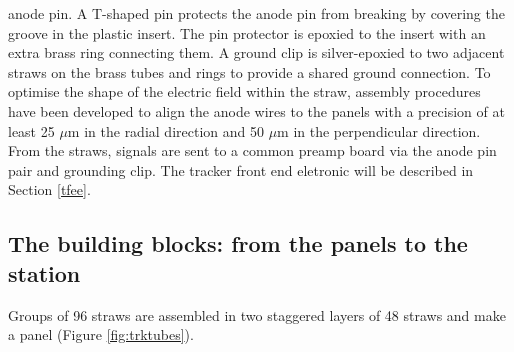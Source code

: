         anode pin. A T-shaped pin protects the anode pin from 
        breaking by covering the groove in the plastic insert. 
        The pin protector is epoxied to the insert with an extra 
        brass ring connecting them. A ground clip is silver-epoxied 
        to two adjacent straws on the brass tubes and rings to 
        provide a shared ground connection.
        To optimise the shape of the electric field within 
        the straw, assembly procedures have been developed 
        to align the anode wires to the panels with a 
        precision of at least 25 $\mu$m in the radial direction and 50 $\mu$m in the perpendicular direction. 
From the straws, signals are sent to a common preamp board 
via the anode pin pair and grounding clip. The tracker front 
end eletronic will be described in Section \ref{tfee}.
\subsection{The building blocks: from the panels to the station}
Groups of 96 straws are assembled in two staggered layers of 48 straws and make a 
panel (Figure \ref{fig:trktubes}). 

